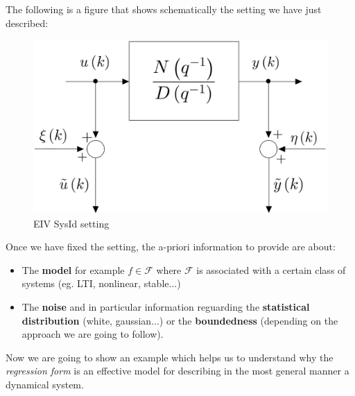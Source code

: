 The following is a figure that shows schematically the setting we have just described: 

\begin{figure}[h]
    \centering
    \includegraphics[scale=0.15]{img/EIV.jpeg}
    \caption{EIV SysId setting}
\end{figure}

\vspace{0.5cm}
\noindent
Once we have fixed the setting, the a-priori information to provide are about: 
\begin{itemize}
    \item The \textbf{model} for example $f\in\mathcal{F}$ where $\mathcal{F}$ is associated with a certain class of systems (eg. LTI, nonlinear, stable...)
    \item The \textbf{noise} and in particular information reguarding the \textbf{statistical distribution} (white, gaussian...) or the \textbf{boundedness} (depending on the approach we are going to follow).
\end{itemize}

\noindent
Now we are going to show an example which helps us to understand why the \textit{regression form} is an effective model for describing in the most general manner a dynamical system. 

